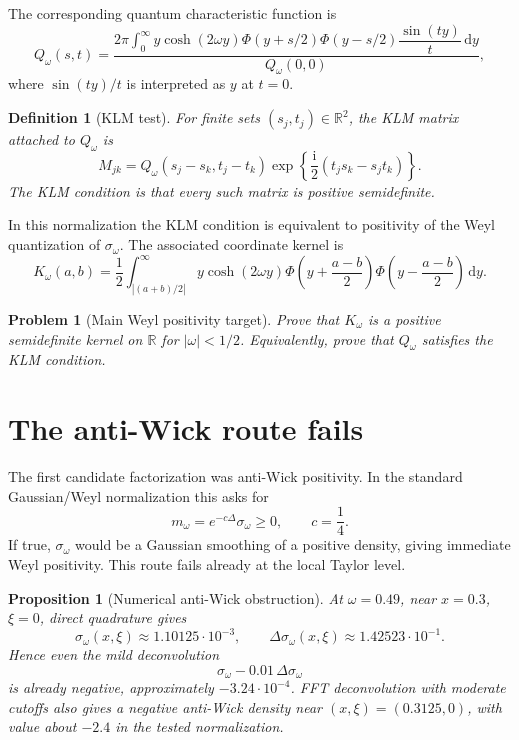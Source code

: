 \documentclass[11pt]{article}
\newtheorem{proposition}[theorem]{Proposition}
\newtheorem{definition}[theorem]{Definition}
\newtheorem{problem}[theorem]{Problem}
\newcommand{\R}{\mathbb R}
\newcommand{\ii}{\mathrm i}
\newcommand{\dd}{\,\mathrm d}
\begin{document}
The corresponding quantum characteristic function is
\begin{equation}
  Q_\omega(s,t)
  =
  \frac{
  2\pi\int_0^\infty
     y\cosh(2\omega y)
     \Phi(y+s/2)\Phi(y-s/2)
     \dfrac{\sin(ty)}{t}\dd y
  }{
  Q_\omega(0,0)
  },
  \label{eq:Q}
\end{equation}
where $\sin(ty)/t$ is interpreted as $y$ at $t=0$.

\begin{definition}[KLM test]
For finite sets $(s_j,t_j)\in\R^2$, the KLM matrix attached to
$Q_\omega$ is
\begin{equation}
   M_{jk}
   =
   Q_\omega(s_j-s_k,t_j-t_k)
   \exp\!\left\{\frac{\ii}{2}(t_js_k-s_jt_k)\right\}.
   \label{eq:KLM}
\end{equation}
The KLM condition is that every such matrix is positive semidefinite.
\end{definition}

In this normalization the KLM condition is equivalent to positivity of the
Weyl quantization of $\sigma_\omega$.  The associated coordinate kernel is
\begin{equation}
  K_\omega(a,b)
  =
  \frac12\int_{|(a+b)/2|}^{\infty}
   y\cosh(2\omega y)
   \Phi\!\left(y+\frac{a-b}{2}\right)
   \Phi\!\left(y-\frac{a-b}{2}\right)\dd y.
  \label{eq:WeylKernel}
\end{equation}

\begin{problem}[Main Weyl positivity target]
Prove that $K_\omega$ is a positive semidefinite kernel on $\R$ for
$|\omega|<1/2$.  Equivalently, prove that $Q_\omega$ satisfies the KLM
condition.
\end{problem}

\section{The anti-Wick route fails}

The first candidate factorization was anti-Wick positivity.  In the standard
Gaussian/Weyl normalization this asks for
\[
      m_\omega=e^{-c\Delta}\sigma_\omega\ge 0,
      \qquad c=\frac14.
\]
If true, $\sigma_\omega$ would be a Gaussian smoothing of a positive density,
giving immediate Weyl positivity.  This route fails already at the local
Taylor level.

\begin{proposition}[Numerical anti-Wick obstruction]
At $\omega=0.49$, near $x=0.3$, $\xi=0$, direct quadrature gives
\[
  \sigma_\omega(x,\xi)\approx 1.10125\cdot 10^{-3},
  \qquad
  \Delta\sigma_\omega(x,\xi)\approx 1.42523\cdot 10^{-1}.
\]
Hence even the mild deconvolution
\[
     \sigma_\omega-0.01\,\Delta\sigma_\omega
\]
is already negative, approximately $-3.24\cdot 10^{-4}$.
FFT deconvolution with moderate cutoffs also gives a negative anti-Wick
density near $(x,\xi)=(0.3125,0)$, with value about $-2.4$ in the tested
normalization.
\end{proposition}
\end{document}
